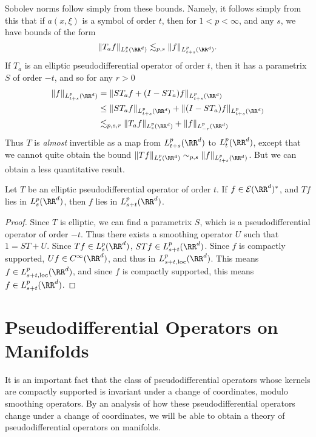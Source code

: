 Sobolev norms follow simply from these bounds. Namely, it follows simply from this that if $a(x,\xi)$ is a symbol of order $t$, then for $1 < p < \infty$, and any $s$, we have bounds of the form
%
\[ \| T_a f \|_{L^p_s(\RR^d)} \lesssim_{p,s} \| f \|_{L^p_{t + s}(\RR^d)}. \]
%
If $T_a$ is an elliptic pseudodifferential operator of order $t$, then it has a parametrix $S$ of order $-t$, and so for any $r > 0$
%
\begin{align*}
    \| f \|_{L^p_{t + s}(\RR^d)} &= \| ST_a f + (I - ST_a) f \|_{L^p_{t+s}(\RR^d)}\\
    &\leq \| ST_a f \|_{L^p_{t+s}(\RR^d)} + \| (I - ST_a) f \|_{L^p_{t+s}(\RR^d)}\\
    &\lesssim_{p,s,r} \| T_a f \|_{L^p_s(\RR^d)} + \| f \|_{L^p_{-r}(\RR^d)} 
\end{align*}
%
Thus $T$ is \emph{almost} invertible as a map from $L^p_{t+s}(\RR^d)$ to $L^p_t(\RR^d)$, except that we cannot quite obtain the bound $\| T f \|_{L^p_s(\RR^d)} \sim_{p,s} \| f \|_{L^p_{t + s}(\RR^d)}$. But we can obtain a less quantitative result.

\begin{theorem}
    Let $T$ be an elliptic pseudodifferential operator of order $t$. If $f \in \mathcal{E}(\RR^d)^*$, and $Tf$ lies in $L^p_s(\RR^d)$, then $f$ lies in $L^p_{s + t}(\RR^d)$.
\end{theorem}
\begin{proof}
    Since $T$ is elliptic, we can find a parametrix $S$, which is a pseudodifferential operator of order $-t$. Thus there exists a smoothing operator $U$ such that $1 = ST + U$. Since $Tf \in L^p_s(\RR^d)$, $STf \in L^p_{s + t}(\RR^d)$. Since $f$ is compactly supported, $Uf \in C^\infty(\RR^d)$, and thus in $L^p_{s+t,\text{loc}}(\RR^d)$. This means $f \in L^p_{s+t,\text{loc}}(\RR^d)$, and since $f$ is compactly supported, this means $f \in L^p_{s+t}(\RR^d)$.
\end{proof}















\section{Pseudodifferential Operators on Manifolds}

It is an important fact that the class of pseudodifferential operators whose kernels are compactly supported is invariant under a change of coordinates, modulo smoothing operators. By an analysis of how these pseudodifferential operators change under a change of coordinates, we will be able to obtain a theory of pseudodifferential operators on manifolds.

